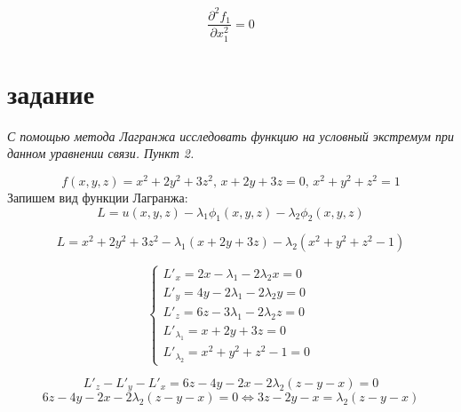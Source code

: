 \documentclass[a5paper, 10pt]{article}
\theoremstyle{definition}
\theoremstyle{plain}
\theoremstyle{remark}
\begin{document}
\begin{equation}
\frac{\partial ^ 2 f_1}{\partial x_1^2} = 0
\end{equation}










\newpage

\section{задание}
\textit{С помощью метода Лагранжа исследовать функцию на условный экстремум при данном уравнении связи. Пункт 2.}

\begin{equation}
f(x, y, z) = x^2+2y^2+3z^2, \, x + 2y+3z=0, \, x^2 +y^2+z^2=1
\end{equation}
Запишем вид функции Лагранжа:
\begin{equation}
L = u(x, y, z) - \lambda_1 \phi_1 (x, y, z) - \lambda_2 \phi_2 (x, y, z)
\end{equation}

\begin{equation}
L = x^2+2y^2+3z^2  - \lambda_1 \left(  x + 2y+3z \right) - \lambda_2 \left( x^2 +y^2+z^2 - 1   \right)
\end{equation}

\begin{equation}
\begin{cases}
L'_x = 2x - \lambda_1 -2 \lambda_2 x = 0\\
L'_y = 4y  - 2\lambda_1  - 2\lambda_2 y = 0\\
L'_z = 6z  - 3 \lambda_1  - 2\lambda_2 z = 0\\
L'_{\lambda_1}=   x + 2y+3z = 0\\
L'_ { \lambda_2} =  x^2 +y^2+z^2 - 1 = 0
\end{cases}
\end{equation}

\begin{equation}
L'_z - L'_y - L'_x = 6z-4y-2x -2 \lambda_2 (z - y - x) = 0
\end{equation}
\begin{equation}
6z-4y-2x -2 \lambda_2 (z - y - x) = 0 \Leftrightarrow 3z-2y-x = \lambda_2 (z - y - x)
\end{equation}
\end{document}
